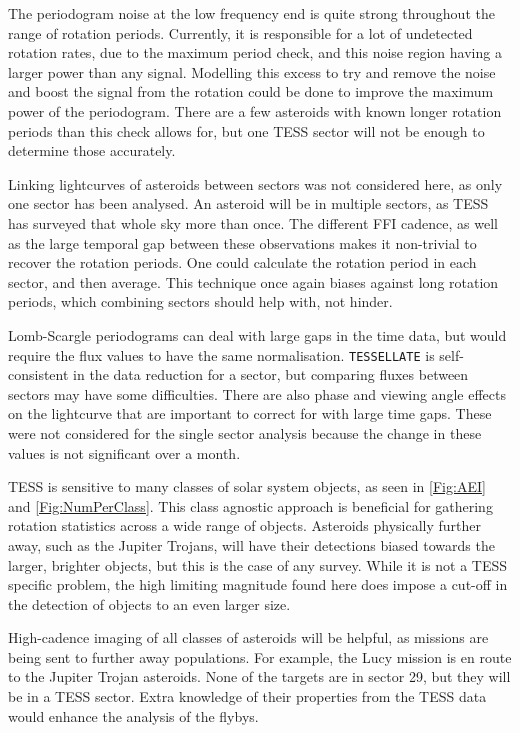 \documentclass{UCreport}
\begin{document}
The periodogram noise at the low frequency end is quite strong throughout the range of rotation periods.
Currently, it is responsible for a lot of undetected rotation rates, due to the maximum period check, and this noise region having a larger power than any signal.
Modelling this excess to try and remove the noise and boost the signal from the rotation could be done to improve the maximum power of the periodogram.
There are a few asteroids with known longer rotation periods than this check allows for, but one TESS sector will not be enough to determine those accurately.

Linking lightcurves of asteroids between sectors was not considered here, as only one sector has been analysed.
An asteroid will be in multiple sectors, as TESS has surveyed that whole sky more than once.
The different FFI cadence, as well as the large temporal gap between these observations makes it non-trivial to recover the rotation periods.
One could calculate the rotation period in each sector, and then average.
This technique once again biases against long rotation periods, which combining sectors should help with, not hinder.

Lomb-Scargle periodograms can deal with large gaps in the time data, but would require the flux values to have the same normalisation.
\texttt{TESSELLATE} is self-consistent in the data reduction for a sector, but comparing fluxes between sectors may have some difficulties.
There are also phase and viewing angle effects on the lightcurve that are important to correct for with large time gaps. %
These were not considered for the single sector analysis because the change in these values is not significant over a month.

TESS is sensitive to many classes of solar system objects, as seen in \autoref{Fig:AEI} and \autoref{Fig:NumPerClass}. 
This class agnostic approach is beneficial for gathering rotation statistics across a wide range of objects. 
Asteroids physically further away, such as the Jupiter Trojans, will have their detections biased towards the larger, brighter objects, but this is the case of any survey.
While it is not a TESS specific problem, the high limiting magnitude found here does impose a cut-off in the detection of objects to an even larger size. 

High-cadence imaging of all classes of asteroids will be helpful, as missions are being sent to further away populations.
For example, the Lucy mission \citep{Olkin2021} is en route to the Jupiter Trojan asteroids.
None of the targets are in sector 29, but they will be in a TESS sector. 
Extra knowledge of their properties from the TESS data would enhance the analysis of the flybys.
\end{document}
